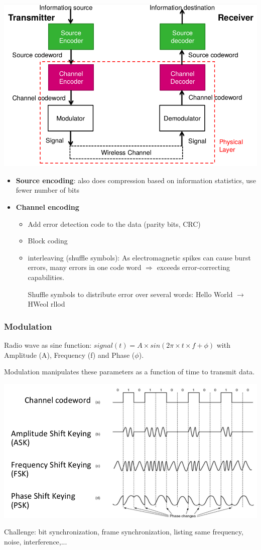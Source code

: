 \begin{center}
    \includegraphics[width=0.8\linewidth]{img/physical.png}
\end{center}

\begin{itemize}
    \item \textbf{Source encoding}: also does compression based on
        information statistics, use fewer number of bits

    \item \textbf{Channel encoding}
        \begin{itemize}
            \item Add error detection code to the data (parity bits, CRC)
            \item Block coding 

            \item interleaving (shuffle symbols): As electromagnetic spikes can
                cause burst errors, many errors in one code word $\Rightarrow$
                exceeds error-correcting capabilities.

                Shuffle symbols to distribute error over several words: Hello
                World $\rightarrow$ HWeol rllod
        \end{itemize}
\end{itemize}

\subsubsection{Modulation}
Radio wave as sine function: $signal(t) = A \times sin(2\pi \times t
\times f + \phi)$ with Amplitude (A), Frequency (f) and Phase ($\phi$).


Modulation manipulates these parameters as a function of time to
transmit data.
\begin{center}
    \includegraphics[width=0.6\linewidth]{img/modulation.png}
\end{center}

Challenge: bit synchronization, frame synchronization, listing same
frequency, noise, interference,...


